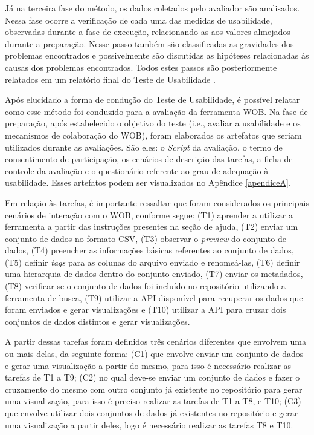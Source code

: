 Já na terceira fase do método, os dados coletados pelo avaliador são analisados. Nessa fase 
ocorre a verificação de cada uma das medidas de usabilidade, observadas durante a fase de 
execução, relacionando-as aos valores almejados durante a preparação. Nesse passo também 
são classificadas as gravidades dos problemas encontrados e possivelmente são discutidas as 
hipóteses relacionadas às causas dos problemas encontrados. Todos estes passos são 
posteriormente relatados em um relatório final do Teste de Usabilidade \cite{barbosa2010}.

Após elucidado a forma de condução do Teste de Usabilidade, é possível relatar como esse 
método foi conduzido para a avaliação da ferramenta WOB. Na fase de preparação, após 
estabelecido o objetivo do teste (i.e., avaliar a usabilidade e os mecanismos de 
colaboração do WOB), foram elaborados os artefatos que seriam utilizados durante as 
avaliações. São eles: o \textit{Script} da avaliação, o termo de consentimento de participação, 
os cenários de descrição das tarefas, a ficha de controle da avaliação e o questionário
referente ao grau de adequação à usabilidade. Esses artefatos podem ser visualizados no 
Apêndice \ref{apendiceA}.

Em relação às tarefas, é importante ressaltar que foram considerados os principais cenários 
de interação com o WOB, conforme segue: (T1) aprender a utilizar a ferramenta a partir das 
instruções presentes na seção de ajuda, (T2) enviar um conjunto de dados no formato CSV, (T3) 
observar o \textit{preview} do conjunto de dados, (T4) preencher as informações básicas referentes ao 
conjunto de dados, (T5) definir \textit{tags} para as colunas do arquivo enviado e 
renomeá-las, (T6) definir uma hierarquia de dados dentro do conjunto enviado, (T7) enviar os 
metadados, (T8) verificar se o conjunto de dados foi incluído no repositório utilizando a 
ferramenta de busca, (T9) utilizar a API disponível para recuperar os dados que foram 
enviados e gerar visualizações e (T10) utilizar a API para cruzar dois conjuntos de 
dados distintos e gerar visualizações. 

A partir dessas tarefas foram definidos três cenários diferentes que envolvem uma ou mais 
delas, da seguinte forma: (C1) que envolve enviar um conjunto de dados e gerar uma 
visualização a partir do mesmo, para isso é necessário realizar as tarefas de T1 a T9; 
(C2) no qual deve-se enviar um conjunto de dados e fazer o cruzamento do mesmo com outro 
conjunto já existente no repositório para gerar uma visualização, para isso é 
preciso realizar as tarefas de T1 a T8, e T10; (C3) que envolve utilizar dois conjuntos de 
dados já existentes no repositório e gerar uma visualização a partir deles, logo é 
necessário realizar as tarefas T8 e T10. 

